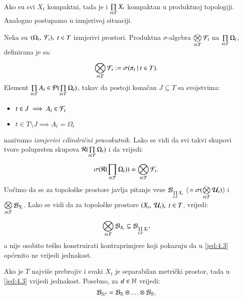 Ako su svi $X_t$ kompaktni, tada je i $\prod\limits_{t \in T}^{} X_t$ kompaktan u produktnoj topologiji.
Analogno postupamo u izmjerivoj situaciji.

Neka su $(\Omega_t, \: \mathcal{F}_t), \; t \in T$ izmjerivi prostori.
Produktna $\sigma$-algebra $\bigotimes\limits_{t \in T}^{} \mathcal{F}_t$ na $\prod\limits_{t \in T}^{} \Omega_t$, definirana je sa:
\begin{equation}    \label{jed:4.1}
    \bigotimes\limits_{t \in T}^{} \mathcal{F}_t := \sigma({\pi_t} \: | \: {t \in T}).
\end{equation} 
Element $\prod\limits_{t \in T}^{} A_t \in \mathcal{P}({\prod\limits_{t \in T}^{} \Omega_t})$, takav da postoji kona\v can $J \subseteq T$ sa svojstvima:
\begin{itemize}[label=]
    \item $t \in J \implies A_t \in \mathcal{F}_t$
    \item $ t \in T \setminus J \implies A_t = \Omega_t $
\end{itemize}
nazivamo \emph{izmjerivi cilindri\v cni pravokutnik}.
Lako se vidi da svi takvi skupovi tvore poluprsten skupova $\mathcal{R}({\prod\limits_{t \in T}^{} \Omega_t})$ i da vrijedi:
\begin{equation}    \label{jed:4.2}
    \sigma({\mathcal{R}({\prod\limits_{t \in T}^{} \Omega_t})}) = \bigotimes\limits_{t \in T}^{} \mathcal{F}_t.
\end{equation}
Uo\v cimo da se za topolo\v ske prostore javlja pitanje veze $\mathcal{B}_{\prod\limits_{t \in T}^{} X_t}$ ($= \sigma({\bigotimes\limits_{t \in T}^{} \mathcal{U}_t})$) i $\bigotimes\limits_{t \in T}^{} \mathcal{B}_{X_t}$.
Lako se vidi da za topolo\v ske prostore $(X_t, \: \mathcal{U}_t), \; t \in T$, vrijedi:
\begin{equation}    \label{jed:4.3}
    \bigotimes\limits_{t \in T}^{} \mathcal{B}_{X_t} \subseteq \mathcal{B}_{\prod\limits_{t \in T}^{} X_t},
\end{equation}
a nije osobito te\v sko konstruirati kontraprimjere koji pokazuju da u \eqref{jed:4.3} op\' cenito ne vrijedi jednakost.

\begin{zad} \label{zad:4.4}
    Ako je $T$ najvi\v se prebrojiv i svaki $X_t$ je separabilan metri\v cki prostor, tada u \eqref{jed:4.3} vrijedi jednakost.
    Posebno, za $d \in \mathbb{N}$ vrijedi:
    \begin{equation}    \label{jed:4.5}
        \mathcal{B}_{\mathbb{R}^d} = \mathcal{B}_{\mathbb{R}} \otimes \ldots \otimes \mathcal{B}_{\mathbb{R}}.
    \end{equation}
\end{zad}

